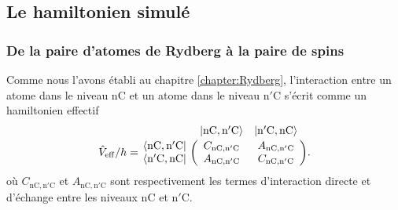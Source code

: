 \subsection{Le hamiltonien simulé}\label{subsec:XXZhamiltonian}
\subsubsection*{De la paire d'atomes de Rydberg à la paire de spins}
\noindent Comme nous l'avons établi au chapitre \ref{chapter:Rydberg}, l'interaction entre un atome dans le niveau $\mathrm{nC}$ et un atome dans le niveau $\mathrm{n'C}$ s'écrit comme un hamiltonien effectif
%
\begin{equation}
\label{eq:Veff_nCn'C}
\hat{V}_{\mathrm{eff}}/h = \bordermatrix{
~ 	&\ket{\mathrm{nC},\mathrm{n'C}} &\ket{\mathrm{n'C},\mathrm{nC}}  \cr
	\bra{\mathrm{nC},\mathrm{n'C}} & C_{\mathrm{nC},\mathrm{n'C}} & A_{\mathrm{nC},\mathrm{n'C}}\cr
	\bra{\mathrm{n'C},\mathrm{nC}} & A_{\mathrm{nC},\mathrm{n'C}} & C_{\mathrm{nC},\mathrm{n'C}}\cr
	}.
\end{equation}
%
où $C_{\mathrm{nC},\mathrm{n'C}}$ et $A_{\mathrm{nC},\mathrm{n'C}}$ sont respectivement les termes d'interaction directe et d'échange entre les niveaux $\mathrm{nC}$ et $\mathrm{n'C}$.

